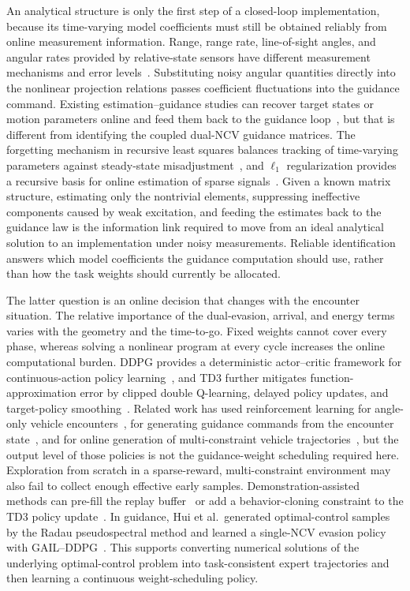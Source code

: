 An analytical structure is only the first step of a closed-loop implementation, because its time-varying model coefficients must still be obtained reliably from online measurement information. Range, range rate, line-of-sight angles, and angular rates provided by relative-state sensors have different measurement mechanisms and error levels~\cite{skolnik2008}. Substituting noisy angular quantities directly into the nonlinear projection relations passes coefficient fluctuations into the guidance command. Existing estimation--guidance studies can recover target states or motion parameters online and feed them back to the guidance loop~\cite{liu2025}, but that is different from identifying the coupled dual-NCV guidance matrices. The forgetting mechanism in recursive least squares balances tracking of time-varying parameters against steady-state misadjustment~\cite{paleologu2008,bruce2020}, and $\ell_1$ regularization provides a recursive basis for online estimation of sparse signals~\cite{angelosante2010}. Given a known matrix structure, estimating only the nontrivial elements, suppressing ineffective components caused by weak excitation, and feeding the estimates back to the guidance law is the information link required to move from an ideal analytical solution to an implementation under noisy measurements. Reliable identification answers which model coefficients the guidance computation should use, rather than how the task weights should currently be allocated.

The latter question is an online decision that changes with the encounter situation. The relative importance of the dual-evasion, arrival, and energy terms varies with the geometry and the time-to-go. Fixed weights cannot cover every phase, whereas solving a nonlinear program at every cycle increases the online computational burden. DDPG provides a deterministic actor--critic framework for continuous-action policy learning~\cite{lillicrap2016}, and TD3 further mitigates function-approximation error by clipped double Q-learning, delayed policy updates, and target-policy smoothing~\cite{fujimoto2018}. Related work has used reinforcement learning for angle-only vehicle encounters~\cite{gaudet2020}, for generating guidance commands from the encounter state~\cite{he2021}, and for online generation of multi-constraint vehicle trajectories~\cite{li2024td3hgv}, but the output level of those policies is not the guidance-weight scheduling required here. Exploration from scratch in a sparse-reward, multi-constraint environment may also fail to collect enough effective early samples. Demonstration-assisted methods can pre-fill the replay buffer~\cite{vecerik2017} or add a behavior-cloning constraint to the TD3 policy update~\cite{fujimoto2021}. In guidance, Hui et al.\ generated optimal-control samples by the Radau pseudospectral method and learned a single-NCV evasion policy with GAIL--DDPG~\cite{hui2025}. This supports converting numerical solutions of the underlying optimal-control problem into task-consistent expert trajectories and then learning a continuous weight-scheduling policy.

